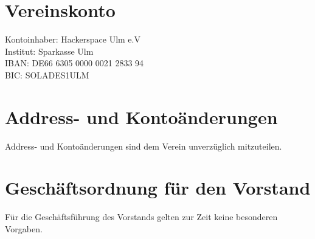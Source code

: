 \documentclass[a4paper, 12pt]{scrartcl}
\begin{document}
\section{Vereinskonto}
\begin{addmargin}[1in]{0cm}
Kontoinhaber:	Hackerspace Ulm e.V\\
Institut:	Sparkasse Ulm\\
IBAN:	DE66 6305 0000 0021 2833 94\\
BIC:	SOLADES1ULM\\
\end{addmargin}

\section{Address- und Kontoänderungen}
Address- und Kontoänderungen sind dem Verein unverzüglich mitzuteilen.


\section{Geschäftsordnung für den Vorstand}
Für die Geschäftsführung des Vorstands gelten zur Zeit keine besonderen Vorgaben. 
\end{document}
